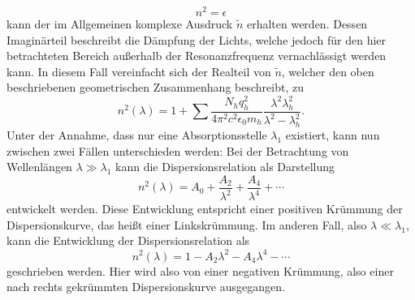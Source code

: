 \begin{equation}
  n^2 = \epsilon
\end{equation}
kann der im Allgemeinen komplexe Ausdruck $\tilde{n}$ erhalten werden.
Dessen Imaginärteil beschreibt die Dämpfung der Lichts, welche jedoch für den hier betrachteten Bereich außerhalb der Resonanzfrequenz vernachlässigt werden kann.
In diesem Fall vereinfacht sich der Realteil von $\tilde{n}$, welcher den oben beschriebenen geometrischen Zusammenhang beschreibt, zu
\begin{equation}
  n^2(\lambda) = 1 + \sum \frac{N_h q_h^2}{4 \pi^2 c^2 \epsilon_0 m_h} \frac{\lambda^2 \lambda_h^2}{\lambda^2 - \lambda_h^2}. \label{kakapipi_ja_das_habe_ich_wirklich_geschrieben}
\end{equation}
Unter der Annahme, dass nur eine Absorptionsstelle $\lambda_1$ existiert, kann nun zwischen zwei Fällen unterschieden werden:
Bei der Betrachtung von Wellenlängen $\lambda \gg \lambda_1$ kann die Dispersionsrelation als Darstellung
\begin{equation}
  n^2(\lambda) = A_0 + \frac{A_2}{\lambda^2} + \frac{A_4}{\lambda^4} + \dotsb
  \label{eqn:d1}
\end{equation}
entwickelt werden.
Diese Entwicklung entspricht einer positiven Krümmung der Dispersionskurve, das heißt einer Linkskrümmung.
Im anderen Fall, also $\lambda \ll \lambda_1$, kann die Entwicklung der Dispersionsrelation als
\begin{equation}
  n^2(\lambda) =  1 - A_2 \lambda^2 - A_4 \lambda^4 - \dotsb
  \label{eqn:d2}
\end{equation}
geschrieben werden.
Hier wird also von einer negativen Krümmung, also einer nach rechts gekrümmten Dispersionskurve ausgegangen.
